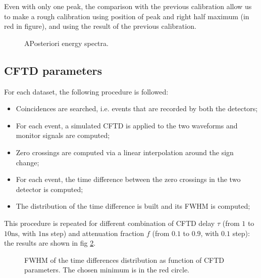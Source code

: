 \documentclass[11pt,a4 paper]{article}
\begin{document}
Even with only one peak, the comparison with the previous calibration allow us to make a rough calibration using position of peak and right half maximum (in red in figure), and using the result of the previous calibration.

\begin{figure}[H]
    \centering
    \caption{APosteriori energy spectra.}
    \label{fig:aposteriori_energy}
\end{figure}

\subsection{CFTD parameters}
For each dataset, the following procedure is followed:
\begin{itemize}[noitemsep]
    \item Coincidences are searched, i.e. events that are recorded by both the detectors;
    \item For each event, a simulated CFTD is applied to the two waveforms and monitor signals are computed;
    \item Zero crossings are computed via a linear interpolation around the sign change;
    \item For each event, the time difference between the zero crossings in the two detector is computed;
    \item The distribution of the time difference is built and its FWHM is computed;
\end{itemize}
This procedure is repeated for different combination of CFTD delay $\tau$ (from $1$ to $10\si{\nano\second}$, with $1\si{\nano\second}$ step) and attenuation fraction $f$ (from $0.1$ to $0.9$, with $0.1$ step): the results are shown in fig \ref{fig:FWHM2D:sim}.



\begin{figure}[H]
    \centering
    \caption{FWHM of the time differences distribution as function of CFTD parameters. The chosen minimum is in the red circle.}
    \label{fig:FWHM2D:sim}
\end{figure}
\end{document}
